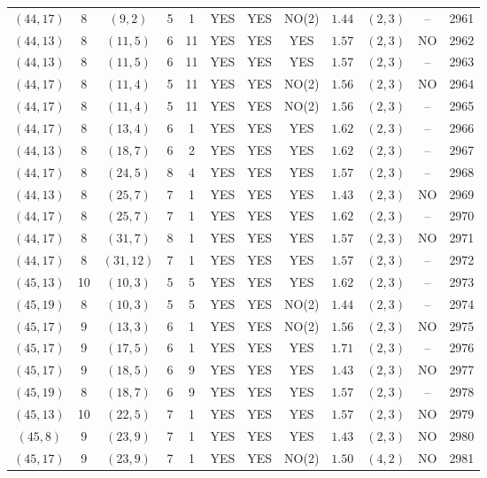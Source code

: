 \begin{longtable}{|c|c|c|c|c|c|c|c|c|c|c|c|}
$(44,17)$ & 8 & $(9,2)$ & 5 & 1 & YES & YES & NO(2) & $1.44$ & $(2,3)$ & -- & 2961\\
$(44,13)$ & 8 & $(11,5)$ & 6 & 11 & YES & YES & YES & $1.57$ & $(2,3)$ & NO & 2962\\
$(44,13)$ & 8 & $(11,5)$ & 6 & 11 & YES & YES & YES & $1.57$ & $(2,3)$ & -- & 2963\\
$(44,17)$ & 8 & $(11,4)$ & 5 & 11 & YES & YES & NO(2) & $1.56$ & $(2,3)$ & NO & 2964\\
$(44,17)$ & 8 & $(11,4)$ & 5 & 11 & YES & YES & NO(2) & $1.56$ & $(2,3)$ & -- & 2965\\
$(44,17)$ & 8 & $(13,4)$ & 6 & 1 & YES & YES & YES & $1.62$ & $(2,3)$ & -- & 2966\\
$(44,13)$ & 8 & $(18,7)$ & 6 & 2 & YES & YES & YES & $1.62$ & $(2,3)$ & -- & 2967\\
$(44,17)$ & 8 & $(24,5)$ & 8 & 4 & YES & YES & YES & $1.57$ & $(2,3)$ & -- & 2968\\
$(44,13)$ & 8 & $(25,7)$ & 7 & 1 & YES & YES & YES & $1.43$ & $(2,3)$ & NO & 2969\\
$(44,17)$ & 8 & $(25,7)$ & 7 & 1 & YES & YES & YES & $1.62$ & $(2,3)$ & -- & 2970\\
$(44,17)$ & 8 & $(31,7)$ & 8 & 1 & YES & YES & YES & $1.57$ & $(2,3)$ & NO & 2971\\
$(44,17)$ & 8 & $(31,12)$ & 7 & 1 & YES & YES & YES & $1.57$ & $(2,3)$ & -- & 2972\\
$(45,13)$ & 10 & $(10,3)$ & 5 & 5 & YES & YES & YES & $1.62$ & $(2,3)$ & -- & 2973\\
$(45,19)$ & 8 & $(10,3)$ & 5 & 5 & YES & YES & NO(2) & $1.44$ & $(2,3)$ & -- & 2974\\
$(45,17)$ & 9 & $(13,3)$ & 6 & 1 & YES & YES & NO(2) & $1.56$ & $(2,3)$ & NO & 2975\\
$(45,17)$ & 9 & $(17,5)$ & 6 & 1 & YES & YES & YES & $1.71$ & $(2,3)$ & -- & 2976\\
$(45,17)$ & 9 & $(18,5)$ & 6 & 9 & YES & YES & YES & $1.43$ & $(2,3)$ & NO & 2977\\
$(45,19)$ & 8 & $(18,7)$ & 6 & 9 & YES & YES & YES & $1.57$ & $(2,3)$ & -- & 2978\\
$(45,13)$ & 10 & $(22,5)$ & 7 & 1 & YES & YES & YES & $1.57$ & $(2,3)$ & NO & 2979\\
$(45,8)$ & 9 & $(23,9)$ & 7 & 1 & YES & YES & YES & $1.43$ & $(2,3)$ & NO & 2980\\
$(45,17)$ & 9 & $(23,9)$ & 7 & 1 & YES & YES & NO(2) & $1.50$ & $(4,2)$ & NO & 2981\\

\end{longtable}
